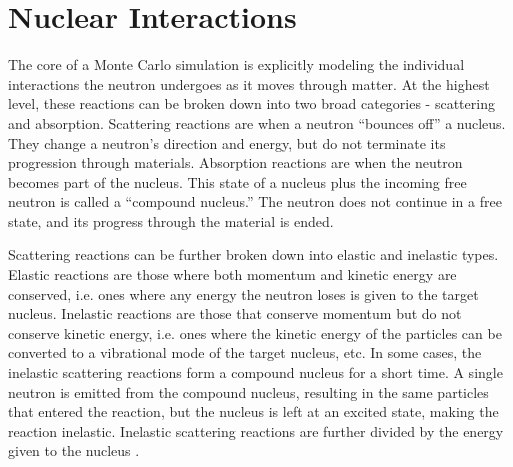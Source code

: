 %
%
%


\section{Nuclear Interactions}
\label{subsec:interactions}

The core of a Monte Carlo simulation is explicitly modeling the individual interactions the neutron undergoes as it moves through matter.  At the highest level, these reactions can be broken down into two broad categories - scattering and absorption.  Scattering reactions are when a neutron ``bounces off'' a nucleus.  They change a neutron's direction and energy, but do not terminate its progression through materials.  Absorption reactions are when the neutron becomes part of the nucleus.  This state of a nucleus plus the incoming free neutron is called a ``compound nucleus.''  The neutron does not continue in a free state, and its progress through the material is ended.

Scattering reactions can be further broken down into elastic and inelastic types.  Elastic reactions are those where both momentum and kinetic energy are conserved, i.e. ones where any energy the neutron loses is given to the target nucleus.  Inelastic reactions are those that conserve momentum but do not conserve kinetic energy, i.e. ones where the kinetic energy of the particles can be converted to a vibrational mode of the target nucleus, etc.  In some cases, the inelastic scattering reactions form a compound nucleus for a short time.  A single neutron is emitted from the compound nucleus, resulting in the same particles that entered the reaction, but the nucleus is left at an excited state, making the reaction inelastic.  Inelastic scattering reactions are further divided by the energy given to the nucleus \cite{duderstadt}.  

